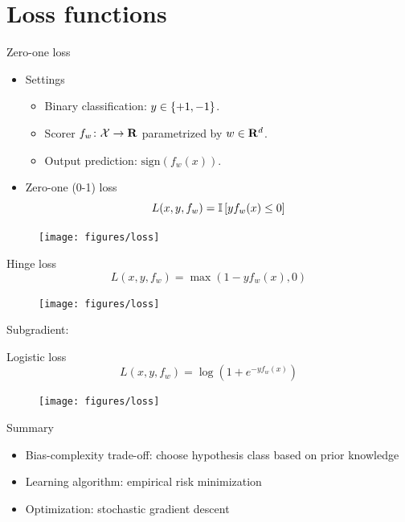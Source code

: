 \documentclass[usenames,dvipsnames,notes]{beamer}
\begin{document}
\section{Loss functions}

\begin{frame}
    {Zero-one loss}
    \begin{itemize}
        \item Settings
            \begin{itemize}
                \item[] Binary classification: $y\in\left\{ +1, -1 \right\}$.
                \item[] Scorer $f_w\colon \mathcal{X} \rightarrow \mathbf{R}$ parametrized by $w \in \mathbf{R}^d$.
                \item[] Output prediction: $\text{sign}(f_w(x))$.
            \end{itemize}
        \item Zero-one (0-1) loss
            $$
            L(x, y, f_w) = \mathbb{I}\left[ yf_w(x) \le 0 \right]
            $$
    \end{itemize}
    \begin{figure}
        \texttt{[image: figures/loss]}
    \end{figure}
\end{frame}

\begin{frame}
    {Hinge loss}
    $$
    L(x,y,f_w) = \max(1-yf_w(x), 0)
    $$
    \begin{figure}
        \texttt{[image: figures/loss]}
    \end{figure}
    Subgradient:\\
    \vspace{4em}
\end{frame}

\begin{frame}
    {Logistic loss}
    $$
    L(x,y,f_w) = \log(1+e^{-yf_w(x)})
    $$
    \begin{figure}
        \texttt{[image: figures/loss]}
    \end{figure}
\end{frame}

\begin{frame}
    {Summary}
    \begin{itemize}
        \itemsep2em
        \item Bias-complexity trade-off: choose hypothesis class based on prior knowledge
        \item Learning algorithm: empirical risk minimization
        \item Optimization: stochastic gradient descent
    \end{itemize}
\end{frame}
\end{document}
